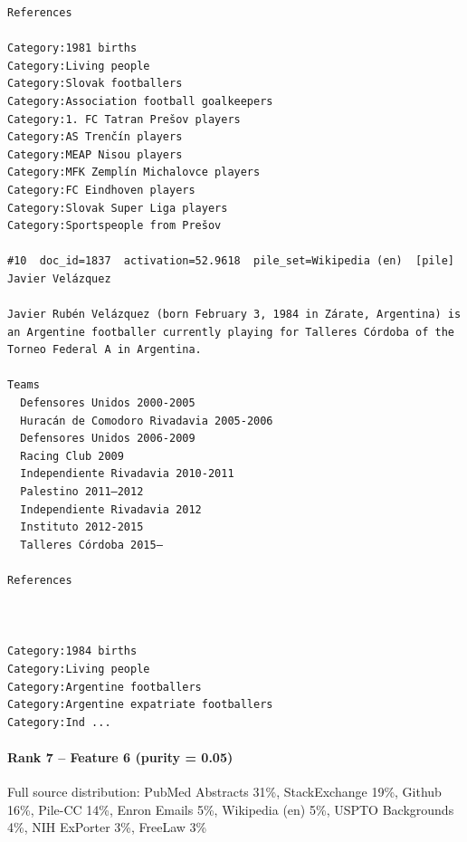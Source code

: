 \begin{verbatim}
References

Category:1981 births
Category:Living people
Category:Slovak footballers
Category:Association football goalkeepers
Category:1. FC Tatran Prešov players
Category:AS Trenčín players
Category:MEAP Nisou players
Category:MFK Zemplín Michalovce players
Category:FC Eindhoven players
Category:Slovak Super Liga players
Category:Sportspeople from Prešov

#10  doc_id=1837  activation=52.9618  pile_set=Wikipedia (en)  [pile]
Javier Velázquez

Javier Rubén Velázquez (born February 3, 1984 in Zárate, Argentina) is an Argentine footballer currently playing for Talleres Córdoba of the Torneo Federal A in Argentina.

Teams
  Defensores Unidos 2000-2005
  Huracán de Comodoro Rivadavia 2005-2006
  Defensores Unidos 2006-2009
  Racing Club 2009
  Independiente Rivadavia 2010-2011
  Palestino 2011–2012
  Independiente Rivadavia 2012
  Instituto 2012-2015
  Talleres Córdoba 2015–

References
 
 

Category:1984 births
Category:Living people
Category:Argentine footballers
Category:Argentine expatriate footballers
Category:Ind ...

\end{verbatim}

\paragraph*{Rank 7 -- Feature 6 (purity = 0.05)}

Full source distribution: PubMed Abstracts 31\%, StackExchange 19\%, Github 16\%, Pile-CC 14\%, Enron Emails 5\%, Wikipedia (en) 5\%, USPTO Backgrounds 4\%, NIH ExPorter 3\%, FreeLaw 3\%

